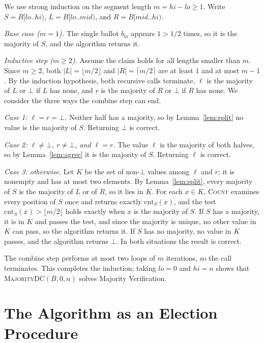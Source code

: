 \documentclass[conference]{IEEEtran}
\newcommand{\cnt}{\mathrm{cnt}}
\begin{document}
\begin{IEEEproof}
We use strong induction on the segment length $m = hi - lo \ge 1$. Write
$S = B[lo..hi)$, $L = B[lo..mid)$, and $R = B[mid..hi)$.

\emph{Base case ($m = 1$).} The single ballot $b_{lo}$ appears $1 > 1/2$
times, so it is the majority of $S$, and the algorithm returns it.

\emph{Inductive step ($m \ge 2$).} Assume the claim holds for all lengths
smaller than $m$. Since $m \ge 2$, both $|L| = \lfloor m/2 \rfloor$ and
$|R| = \lceil m/2 \rceil$ are at least $1$ and at most $m - 1$. By the
induction hypothesis, both recursive calls terminate, $\ell$ is the majority
of $L$ or $\bot$ if $L$ has none, and $r$ is the majority of $R$ or $\bot$ if
$R$ has none. We consider the three ways the combine step can end.

\emph{Case 1: $\ell = r = \bot$.} Neither half has a majority, so by
Lemma~\ref{lem:split} no value is the majority of $S$. Returning $\bot$ is
correct.

\emph{Case 2: $\ell \ne \bot$, $r \ne \bot$, and $\ell = r$.} The value
$\ell$ is the majority of both halves, so by Lemma~\ref{lem:agree} it is the
majority of $S$. Returning $\ell$ is correct.

\emph{Case 3: otherwise.} Let $K$ be the set of non-$\bot$ values among
$\ell$ and $r$; it is nonempty and has at most two elements. By
Lemma~\ref{lem:split}, every majority of $S$ is the majority of $L$ or of
$R$, so it lies in $K$. For each $x \in K$, \textsc{Count} examines every
position of $S$ once and returns exactly $\cnt_S(x)$, and the test
$\cnt_S(x) > \lfloor m/2 \rfloor$ holds exactly when $x$ is the majority of
$S$. If $S$ has a majority, it is in $K$ and passes the test, and since the
majority is unique, no other value in $K$ can pass, so the algorithm returns
it. If $S$ has no majority, no value in $K$ passes, and the algorithm returns
$\bot$. In both situations the result is correct.

The combine step performs at most two loops of $m$ iterations, so the call
terminates. This completes the induction; taking $lo = 0$ and $hi = n$ shows
that \textsc{MajorityDC}$(B, 0, n)$ solves Majority Verification.
\end{IEEEproof}

\section{The Algorithm as an Election Procedure}\label{sec:domain}
\end{document}
